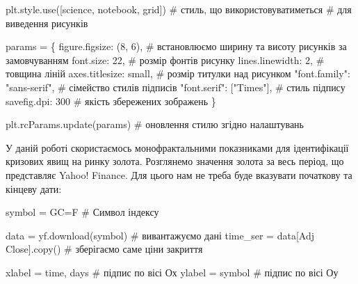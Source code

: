 \documentclass[
  letterpaper,
]{report}
\newenvironment{Shaded}{\begin{snugshade}}{\end{snugshade}}
\newcommand{\CommentTok}[1]{\textcolor[rgb]{0.37,0.37,0.37}{#1}}
\newcommand{\DecValTok}[1]{\textcolor[rgb]{0.68,0.00,0.00}{#1}}
\newcommand{\NormalTok}[1]{\textcolor[rgb]{0.00,0.23,0.31}{#1}}
\newcommand{\OperatorTok}[1]{\textcolor[rgb]{0.37,0.37,0.37}{#1}}
\newcommand{\StringTok}[1]{\textcolor[rgb]{0.13,0.47,0.30}{#1}}
\begin{document}
\begin{Shaded}
\begin{Highlighting}[]
\NormalTok{plt.style.use([}\StringTok{\textquotesingle{}science\textquotesingle{}}\NormalTok{, }\StringTok{\textquotesingle{}notebook\textquotesingle{}}\NormalTok{, }\StringTok{\textquotesingle{}grid\textquotesingle{}}\NormalTok{]) }\CommentTok{\# стиль, що використовуватиметься}
                                               \CommentTok{\# для виведення рисунків}

\NormalTok{params }\OperatorTok{=}\NormalTok{ \{}
    \StringTok{\textquotesingle{}figure.figsize\textquotesingle{}}\NormalTok{: (}\DecValTok{8}\NormalTok{, }\DecValTok{6}\NormalTok{),         }\CommentTok{\# встановлюємо ширину та висоту рисунків за замовчуванням}
    \StringTok{\textquotesingle{}font.size\textquotesingle{}}\NormalTok{: }\DecValTok{22}\NormalTok{,                  }\CommentTok{\# розмір фонтів рисунку}
    \StringTok{\textquotesingle{}lines.linewidth\textquotesingle{}}\NormalTok{: }\DecValTok{2}\NormalTok{,             }\CommentTok{\# товщина ліній}
    \StringTok{\textquotesingle{}axes.titlesize\textquotesingle{}}\NormalTok{: }\StringTok{\textquotesingle{}small\textquotesingle{}}\NormalTok{,        }\CommentTok{\# розмір титулки над рисунком}
    \StringTok{"font.family"}\NormalTok{: }\StringTok{"sans{-}serif"}\NormalTok{,      }\CommentTok{\# сімейство стилів підписів }
    \StringTok{"font.serif"}\NormalTok{: [}\StringTok{"Times"}\NormalTok{],          }\CommentTok{\# стиль підпису}
    \StringTok{\textquotesingle{}savefig.dpi\textquotesingle{}}\NormalTok{: }\DecValTok{300}                \CommentTok{\# якість збережених зображень}
\NormalTok{\}}

\NormalTok{plt.rcParams.update(params)           }\CommentTok{\# оновлення стилю згідно налаштувань}
\end{Highlighting}
\end{Shaded}

У даній роботі скористаємось монофрактальними показниками для
ідентифікації кризових явищ на ринку золота. Розглянемо значення золота
за весь період, що представляє Yahoo! Finance. Для цього нам не треба
буде вказувати початкову та кінцеву дати:

\begin{Shaded}
\begin{Highlighting}[]
\NormalTok{symbol }\OperatorTok{=} \StringTok{\textquotesingle{}GC=F\textquotesingle{}}                       \CommentTok{\# Символ індексу}

\NormalTok{data }\OperatorTok{=}\NormalTok{ yf.download(symbol)            }\CommentTok{\# вивантажуємо дані}
\NormalTok{time\_ser }\OperatorTok{=}\NormalTok{ data[}\StringTok{\textquotesingle{}Adj Close\textquotesingle{}}\NormalTok{].copy()   }\CommentTok{\# зберігаємо саме ціни закриття}

\NormalTok{xlabel }\OperatorTok{=} \StringTok{\textquotesingle{}time, days\textquotesingle{}}                 \CommentTok{\# підпис по вісі Ох }
\NormalTok{ylabel }\OperatorTok{=}\NormalTok{ symbol                       }\CommentTok{\# підпис по вісі Оу}
\end{Highlighting}
\end{Shaded}
\end{document}
